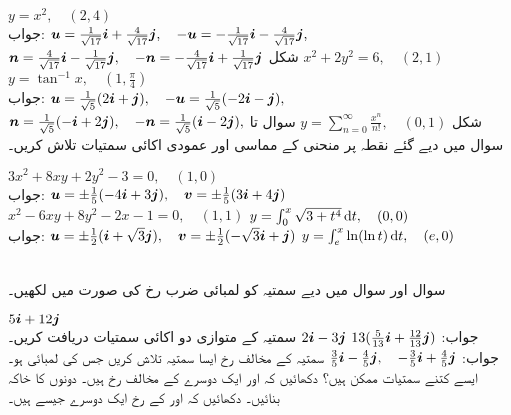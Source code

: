 $y=x^2,\quad (2,4)$\\
جواب:\quad
${{\boldsymbol{u}}}=\tfrac{1}{\sqrt{17}}{\boldsymbol{i}}+\tfrac{4}{\sqrt{17}}{\boldsymbol{j}},\quad -{{\boldsymbol{u}}}=-\tfrac{1}{\sqrt{17}}{\boldsymbol{i}}-\tfrac{4}{\sqrt{17}}{\boldsymbol{j}},$\\
$ {{\boldsymbol{n}}}=\tfrac{4}{\sqrt{17}}{\boldsymbol{i}}-\tfrac{1}{\sqrt{17}}{\boldsymbol{j}},\quad -{{\boldsymbol{n}}}=-\tfrac{4}{\sqrt{17}}{\boldsymbol{i}}+\tfrac{1}{\sqrt{17}}{\boldsymbol{j}}$\quad
شکل 
$x^2+2y^2=6,\quad (2,1)$
$y=\tan^{-1}x,\quad (1,\tfrac{\pi}{4})$\\
جواب:\quad
${{\boldsymbol{u}}}=\tfrac{1}{\sqrt{5}}(2{\boldsymbol{i}}+{\boldsymbol{j}}),\quad -{{\boldsymbol{u}}}=\tfrac{1}{\sqrt{5}}(-2{\boldsymbol{i}}-{\boldsymbol{j}}),$\\
${{\boldsymbol{n}}}=\tfrac{1}{\sqrt{5}}(-{\boldsymbol{i}}+2{\boldsymbol{j}}),\quad -{{\boldsymbol{n}}}=\tfrac{1}{\sqrt{5}}({\boldsymbol{i}}-2{\boldsymbol{j}}),$\quad 
شکل 
$y=\sum_{n=0}^{\infty}\frac{x^n}{n!},\quad (0,1)$
سوال  تا سوال  میں دیے گئے نقطہ پر منحنی کے مماسی اور عمودی اکائی سمتیات تلاش کریں۔ 

$3x^2+8xy+2y^2-3=0,\quad (1,0)$\\
جواب:\quad
${{\boldsymbol{u}}}=\pm\tfrac{1}{5}(-4{\boldsymbol{i}}+3{\boldsymbol{j}}),\quad {\ensuremath{{\boldsymbol{v}}}}=\pm\tfrac{1}{5}(3{\boldsymbol{i}}+4{\boldsymbol{j}})$
$x^2-6xy+8y^2-2x-1=0,\quad (1,1)$
$y=\int_{0}^{x}\sqrt{3+t^4}\dif t,\quad (0,0)$\\
جواب:\quad
${{\boldsymbol{u}}}=\pm\tfrac{1}{2}({\boldsymbol{i}}+\sqrt{3}{\boldsymbol{j}}),\quad {\ensuremath{{\boldsymbol{v}}}}=\pm\tfrac{1}{2}(-\sqrt{3}{\boldsymbol{i}}+{\boldsymbol{j}})$
$y=\int_{e}^{x}\ln (\ln t)\dif t,\quad (e,0)$

\\
سوال  اور سوال  میں دیے سمتیہ کو لمبائی ضرب رخ کی صورت میں لکھیں۔

$5{\boldsymbol{i}}+12{\boldsymbol{j}}$\\
جواب:\quad
$13(\tfrac{5}{13}{\boldsymbol{i}}+\tfrac{12}{13}{\boldsymbol{j}})$
$2{\boldsymbol{i}}-3{\boldsymbol{j}}$
سمتیہ  کے متوازی دو اکائی سمتیات دریافت کریں۔\\
جواب:\quad
$\tfrac{3}{5}{\boldsymbol{i}}-\tfrac{4}{5}{\boldsymbol{j}},\quad -\tfrac{3}{5}{\boldsymbol{i}}+\tfrac{4}{5}{\boldsymbol{j}}$
سمتیہ  کے مخالف رخ ایسا سمتیہ تلاش کریں جس کی لمبائی  ہو۔ ایسے کتنے سمتیات ممکن ہیں؟
دکھائیں کہ  اور  ایک دوسرے کے مخالف رخ ہیں۔ دونوں کا خاکہ بنائیں۔
دکھائیں کہ  اور  کے رخ ایک دوسرے جیسے ہیں۔

